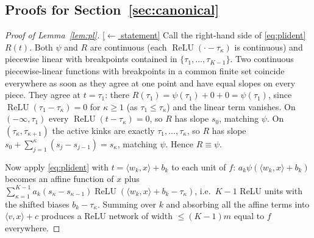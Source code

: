 \documentclass[11pt,reqno]{amsart}
\theoremstyle{plain}
\theoremstyle{definition}
\theoremstyle{remark}
\newcommand{\relu}{\operatorname{ReLU}}
\newcommand{\inn}[2]{\langle #1,#2\rangle}
\newcommand{\stmtbutton}[1]{\hyperref[#1]{\textnormal{\footnotesize\textsf{[$\leftarrow$ statement]}}}}
\begin{document}
\subsection{Proofs for Section~\ref{sec:canonical}}

\begin{proof}[Proof of Lemma~\textup{\ref{lem:pl}}]\label{proof:pl}\stmtbutton{lem:pl}
Call the right-hand side of \eqref{eq:plident} $R(t)$. Both $\psi$ and $R$ are continuous (each $\relu(\cdot-\tau_\kappa)$ is continuous) and piecewise linear with breakpoints contained in $\{\tau_1,\dots,\tau_{K-1}\}$. Two continuous piecewise-linear functions with breakpoints in a common finite set coincide everywhere as soon as they agree at one point and have equal slopes on every piece. They agree at $t=\tau_1$: there $R(\tau_1)=\psi(\tau_1)+0+0=\psi(\tau_1)$, since $\relu(\tau_1-\tau_\kappa)=0$ for $\kappa\ge1$ (as $\tau_1\le\tau_\kappa$) and the linear term vanishes. On $(-\infty,\tau_1)$ every $\relu(t-\tau_\kappa)=0$, so $R$ has slope $s_0$, matching $\psi$. On $(\tau_\kappa,\tau_{\kappa+1})$ the active kinks are exactly $\tau_1,\dots,\tau_\kappa$, so $R$ has slope $s_0+\sum_{j=1}^\kappa(s_j-s_{j-1})=s_\kappa$, matching $\psi$. Hence $R\equiv\psi$.

Now apply \eqref{eq:plident} with $t=\inn{w_k}{x}+b_k$ to each unit of $f$: $a_k\psi(\inn{w_k}{x}+b_k)$ becomes an affine function of $x$ plus $\sum_{\kappa=1}^{K-1}a_k(s_\kappa-s_{\kappa-1})\relu(\inn{w_k}{x}+b_k-\tau_\kappa)$, i.e.\ $K-1$ ReLU units with the shifted biases $b_k-\tau_\kappa$. Summing over $k$ and absorbing all the affine terms into $\inn{v}{x}+c$ produces a ReLU network of width $\le(K-1)m$ equal to $f$ everywhere.
\end{proof}
\end{document}
